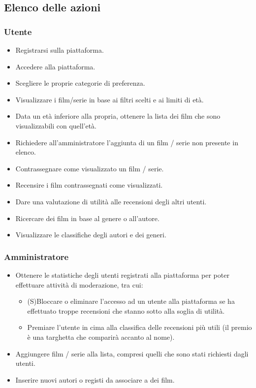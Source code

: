 \documentclass[a4paper,12pt]{report}
\begin{document}
	\subsection{Elenco delle azioni}
	\subsubsection{Utente}
	\begin{itemize}
		\item Registrarsi sulla piattaforma.
		\item Accedere alla piattaforma.
		\item Scegliere le proprie categorie di preferenza.
		\item Visualizzare i film/serie in base ai filtri scelti e ai limiti di età.
		\item Data un età inferiore alla propria, ottenere la lista dei film che sono visualizzabili con quell'età.
		\item Richiedere all'amministratore l'aggiunta di un film / serie non presente in elenco.
		\item Contrassegnare come visualizzato un film / serie.
		\item Recensire i film contrassegnati come visualizzati.
		\item Dare una valutazione di utilità alle recensioni degli altri utenti.
		\item Ricercare dei film in base al genere o all'autore.
		\item Visualizzare le classifiche degli autori e dei generi.
	\end{itemize}
	\subsubsection{Amministratore}
	\begin{itemize}
		\item Ottenere le statistiche degli utenti registrati alla piattaforma per poter effettuare attività di moderazione, tra cui: 
		\begin{itemize}
			\item (S)Bloccare o eliminare l'accesso ad un utente alla piattaforma se ha effettuato troppe recensioni che stanno sotto alla soglia di utilità.
			\item Premiare l'utente in cima alla classifica delle recensioni più utili (il premio è una targhetta che comparirà accanto al nome).
		\end{itemize}
		\item Aggiungere film / serie alla lista, compresi quelli che sono stati richiesti dagli utenti.
		\item Inserire nuovi autori o registi da associare a dei film.
	\end{itemize}
\end{document}
